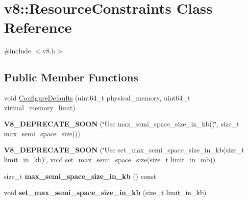 \hypertarget{classv8_1_1ResourceConstraints}{}\section{v8\+:\+:Resource\+Constraints Class Reference}
\label{classv8_1_1ResourceConstraints}


{\ttfamily \#include $<$v8.\+h$>$}

\subsection*{Public Member Functions}
\begin{DoxyCompactItemize}
\item 
void \mbox{\hyperlink{classv8_1_1ResourceConstraints_aeeaaee4017e8d5f8f0439af2af2ed3a5}{Configure\+Defaults}} (uint64\+\_\+t physical\+\_\+memory, uint64\+\_\+t virtual\+\_\+memory\+\_\+limit)
\item 
\mbox{\label{classv8_1_1ResourceConstraints_ac4d579082c042f7083882599b5fb6d73}} 
{\bfseries V8\+\_\+\+D\+E\+P\+R\+E\+C\+A\+T\+E\+\_\+\+S\+O\+ON} (\char`\"{}Use max\+\_\+semi\+\_\+space\+\_\+size\+\_\+in\+\_\+kb()\char`\"{}, size\+\_\+t max\+\_\+semi\+\_\+space\+\_\+size())
\item 
\mbox{\label{classv8_1_1ResourceConstraints_a9a6ea46da51be9c77d55e2165bdbbd69}} 
{\bfseries V8\+\_\+\+D\+E\+P\+R\+E\+C\+A\+T\+E\+\_\+\+S\+O\+ON} (\char`\"{}Use set\+\_\+max\+\_\+semi\+\_\+space\+\_\+size\+\_\+in\+\_\+kb(size\+\_\+t limit\+\_\+in\+\_\+kb)\char`\"{}, void set\+\_\+max\+\_\+semi\+\_\+space\+\_\+size(size\+\_\+t limit\+\_\+in\+\_\+mb))
\item 
\mbox{\label{classv8_1_1ResourceConstraints_addfd17b3241d910daf36dc50b6a7799b}} 
size\+\_\+t {\bfseries max\+\_\+semi\+\_\+space\+\_\+size\+\_\+in\+\_\+kb} () const
\item 
\mbox{\label{classv8_1_1ResourceConstraints_a6ab6168308a1974eb5a09a3a78171e6f}} 
void {\bfseries set\+\_\+max\+\_\+semi\+\_\+space\+\_\+size\+\_\+in\+\_\+kb} (size\+\_\+t limit\+\_\+in\+\_\+kb)
\item 
\mbox{\label{classv8_1_1ResourceConstraints_ab36b6b94c22c7f1e449dd2c337442177}} 

\end{DoxyCompactItemize}
